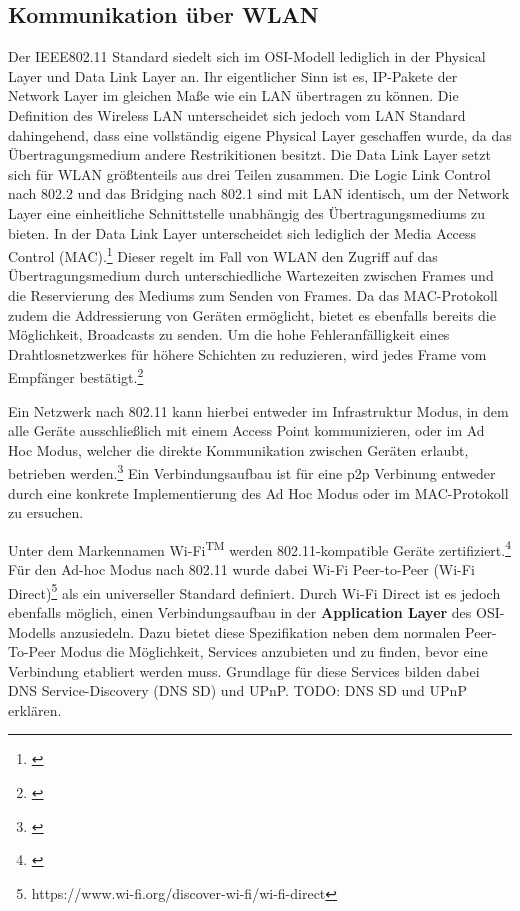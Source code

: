 \documentclass[12pt,a4paper]{article}
\begin{document}
        \subsection{Kommunikation über WLAN}
            Der IEEE802.11 Standard siedelt sich im OSI-Modell lediglich in der Physical Layer und Data Link Layer an. Ihr eigentlicher Sinn ist es,
            IP-Pakete der Network Layer im gleichen Maße wie ein LAN übertragen zu können.
            Die Definition des Wireless LAN unterscheidet sich jedoch vom LAN Standard dahingehend, dass eine vollständig eigene Physical Layer geschaffen wurde,
            da das Übertragungsmedium andere Restrikitionen besitzt. Die Data Link Layer setzt sich für WLAN größtenteils aus drei Teilen zusammen.
            Die Logic Link Control nach 802.2 und das Bridging nach 802.1 sind mit LAN identisch, um der Network Layer eine einheitliche Schnittstelle unabhängig des Übertragungsmediums zu bieten.
            In der Data Link Layer unterscheidet sich lediglich der Media Access Control (MAC).\footnote{\cite[S.311]{Sauter}}
            Dieser regelt im Fall von WLAN den Zugriff auf das Übertragungsmedium durch unterschiedliche Wartezeiten zwischen Frames und die Reservierung des Mediums zum Senden von Frames.
            Da das MAC-Protokoll zudem die Addressierung von Geräten ermöglicht, bietet es ebenfalls bereits die Möglichkeit, Broadcasts zu senden.
            Um die hohe Fehleranfälligkeit eines Drahtlosnetzwerkes für höhere Schichten zu reduzieren, wird jedes Frame vom Empfänger bestätigt.\footnote{\cite[S.325-327]{Sauter}}
            
            Ein Netzwerk nach 802.11 kann hierbei entweder im Infrastruktur Modus, in dem alle Geräte ausschließlich mit einem Access Point kommunizieren,
            oder im Ad Hoc Modus, welcher die direkte Kommunikation zwischen Geräten erlaubt, betrieben werden.\footnote{\cite[S.82]{Sikora}}
            Ein Verbindungsaufbau ist für eine p2p Verbinung entweder durch eine konkrete Implementierung des Ad Hoc Modus oder
            im MAC-Protokoll zu ersuchen.

            Unter dem Markennamen Wi-Fi\textsuperscript{TM} werden 802.11-kompatible Geräte zertifiziert.\footnote{\cite[S.80]{Sikora}}
            Für den Ad-hoc Modus nach 802.11 wurde dabei Wi-Fi Peer-to-Peer (Wi-Fi Direct)\textregistered\footnote{https://www.wi-fi.org/discover-wi-fi/wi-fi-direct} als ein universeller Standard definiert.
            Durch Wi-Fi Direct ist es jedoch ebenfalls möglich, einen Verbindungsaufbau in der {\bf Application Layer} des OSI-Modells anzusiedeln.
            Dazu bietet diese Spezifikation neben dem normalen Peer-To-Peer Modus die Möglichkeit, Services anzubieten und zu finden, bevor eine Verbindung etabliert werden muss.
            Grundlage für diese Services bilden dabei DNS Service-Discovery (DNS SD) und UPnP.
            TODO: DNS SD und UPnP erklären.
\end{document}
